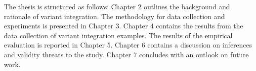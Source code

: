 The thesis is structured as follows: Chapter 2 outlines the background and rationale of variant integration. The methodology for data collection and experiments is presented in Chapter 3. Chapter 4 contains the results from the data collection of variant integration examples. The results of the empirical evaluation is reported in Chapter 5. Chapter 6 contains a discussion on inferences and validity threats to the study. Chapter 7 concludes with an outlook on future work.



